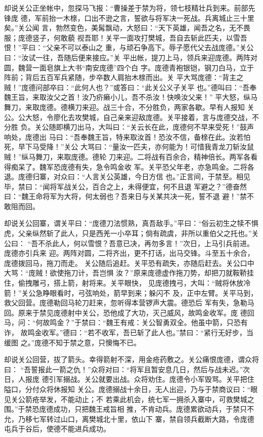 却说关公正坐帐中，忽探马飞报：“曹操差于禁为将，领七枝精壮兵到来。前部先锋庞
德，军前抬一木榇，口出不逊之言，誓欲与将军决一死战。兵离城止三十里矣。”关公闻
言，勃然变色，美髯飘动，大怒曰：“天下英雄，闻吾之名，无不畏服；庞德竖子，何敢藐
视吾耶！关平一面攻打樊城，吾自去斩此匹夫，以雪吾恨！”平曰：“父亲不可以泰山之
重，与顽石争高下。辱子愿代父去战庞德。”关公曰：“汝试一往，吾随后便来接应。”关
平出帐，提刀上马，领兵来迎庞德。两阵对圆，魏营一面皂旗上大书“南安庞德”四个白
字。庞德青袍银铠，钢刀白马，立于阵前；背后五百军兵紧随，步卒数人肩抬木榇而出。关
平大骂庞德：“背主之贼！”庞德问部卒曰：“此何人也？”或答曰：“此关公义子关平
也。”德叫曰：“吾奉魏王旨，来取汝父之首！汝乃疥癞小儿，吾不杀汝！快唤汝父来！”
平大怒，纵马舞刀，来取庞德。德横刀来迎。战三十合，不分胜负，两家各歇。早有人报知
关公。公大怒，令廖化去攻樊城，自己亲来迎敌庞德。关平接着，言与庞德交战，不分胜
负。关公随即横刀出马，大叫曰：“关云长在此，庞德何不早来受死！”鼓声响处，庞德出
马曰：“吾奉魏王旨，特来取汝首！恐汝不信，备榇在此。汝若怕死，早下马受降！”关公
大骂曰：“量汝一匹夫，亦何能为！可惜我青龙刀斩汝鼠贼！”纵马舞刀，来取庞德。德轮
刀来迎。二将战有百余合，精神倍长。两军各看得痴呆了。魏军恐庞德有失，急令鸣金收
军。关平恐父年老，亦急鸣金。二将各退。庞德归寨，对众曰：“人言关公英雄，今日方信
也。”正言间，于禁至。相见毕，禁曰：“闻将军战关公，百合之上，未得便宜，何不且退
军避之？”德奋然曰：“魏王命将军为大将，何太弱也？吾来日与关某共决一死，誓不退
避！”禁不敢阻而回。

却说关公回寨，谓关平曰：“庞德刀法惯熟，真吾敌手。”平曰：“俗云初生之犊不惧
虎，父亲纵然斩了此人，只是西羌一小卒耳；倘有疏虞，非所以重伯父之托也。”关公曰：
“吾不杀此人，何以雪恨？吾意已决，再勿多言！”次日，上马引兵前进。庞德亦引兵来
迎。两阵对圆，二将齐出，更不打话，出马交锋。斗至五十余合，庞德拨回马，拖刀而走。
关公随后追赶。关平恐有疏失，亦随后赶去。关公口中大骂：“庞贼！欲使拖刀计，吾岂惧
汝？”原来庞德虚作拖刀势，却把刀就鞍鞒挂住，偷拽雕弓，搭上箭，射将来。关平眼快，
见庞德拽弓，大叫：“贼将休放冷箭！”关公急睁眼看时，弓弦响处，箭早到来；躲闪不
及，正中左臂。关平马到，救父回营。庞德勒回马轮刀赶来，忽听得本营锣声大震。德恐后
军有失，急勒马回。原来于禁见庞德射中关公，恐他成了大功，灭己威风，故鸣金收军。庞
德回马，问：“何故鸣金？”于禁曰：“魏王有戒：关公智勇双全。他虽中箭，只恐有诈，
故鸣金收军。”德曰：“若不收军，吾已斩了此人也。”禁曰：“紧行无好步，当缓图
之。”庞德不知于禁之意，只懊悔不已。

却说关公回营，拔了箭头。幸得箭射不深，用金疮药敷之。关公痛恨庞德，谓众将曰：
“吾誓报此一箭之仇！”众将对曰：“将军且暂安息几日，然后与战未迟。”次日，人报庞
德引军搦战。关公就要出战。众将劝住。庞德令小军毁骂。关平把住隘口，分付众将休报知
关公。庞德搦战十余日，无人出迎，乃与于禁商议曰：“眼见关公箭疮举发，不能动止；不
若乘此机会，统七军一拥杀入寨中，可救樊城之围。”于禁恐庞德成功，只把魏王戒旨相
推，不肯动兵。庞德累欲动兵，于禁只不允，乃移七军转过山口，离樊城北十里，依山下
寨，禁自领兵截断大路，令庞德屯兵于谷后，使德不能进兵成功。

